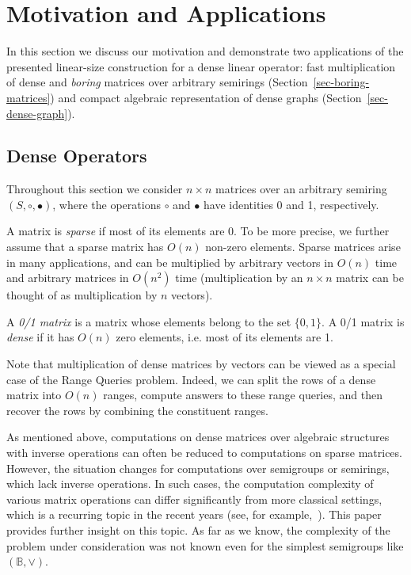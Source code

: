 \documentclass[11pt,letterpaper]{article}
\begin{document}

\section{Motivation and Applications}\label{sec-applications}

In this section we discuss our motivation and demonstrate two applications of
the presented linear-size construction for a dense linear operator: fast
multiplication of dense and \emph{boring} matrices over arbitrary semirings
(Section~\ref{sec-boring-matrices}) and compact algebraic representation of
dense graphs (Section~\ref{sec-dense-graph}).

\subsection{Dense Operators}

Throughout this section we consider $n \times n$ matrices over an arbitrary
semiring $(S, \circ, \bullet)$, where the operations $\circ$ and $\bullet$ have
identities 0 and 1, respectively.

A matrix is \emph{sparse} if most of its elements are 0. To be more precise, we
further assume that a sparse matrix has $O(n)$ non-zero elements. Sparse
matrices arise in many applications, and can be multiplied by arbitrary vectors
in $O(n)$ time and arbitrary matrices in $O(n^2)$ time (multiplication
by an $n\times n$ matrix can be thought of as multiplication by $n$ vectors).

A \emph{0/1 matrix} is a matrix whose elements belong to the set $\{0,1\}$. A
0/1 matrix is \emph{dense} if it has $O(n)$ zero elements, i.e. most of its
elements are 1.

Note that multiplication of dense matrices by vectors can be viewed as a special
case of the Range Queries problem. Indeed, we can split the rows of a dense
matrix into $O(n)$ ranges, compute answers to these range queries, and then
recover the rows by combining the constituent ranges.

As mentioned above, computations on dense matrices over algebraic structures
with inverse operations can often be reduced to computations on sparse matrices.
However, the situation changes for computations over semigroups or semirings,
which lack inverse operations. In such cases, the computation complexity of
various matrix operations can differ significantly from more classical settings,
which is a recurring topic in the recent years (see, for
example,~\cite{AkianGG12,Williams14,GrigorievP15}). This paper provides further
insight on this topic. As far as we know, the complexity of the problem under
consideration was not known even for the simplest semigroups like
$(\mathbb{B},\vee)$.
\end{document}
